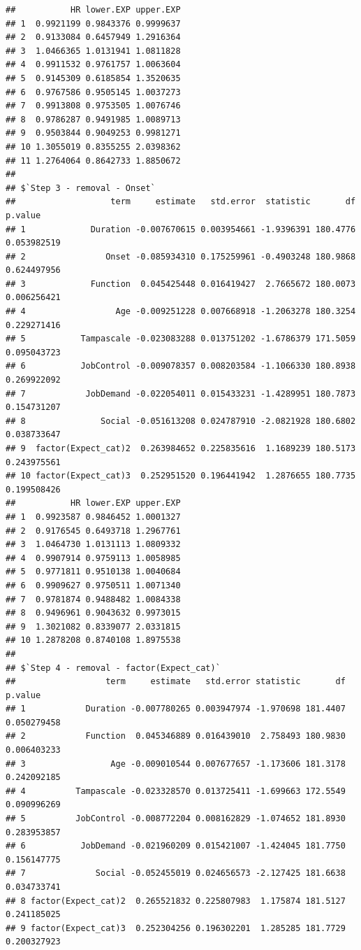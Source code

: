 \documentclass[
]{book}
\begin{document}
\begin{verbatim}
##           HR lower.EXP upper.EXP
## 1  0.9921199 0.9843376 0.9999637
## 2  0.9133084 0.6457949 1.2916364
## 3  1.0466365 1.0131941 1.0811828
## 4  0.9911532 0.9761757 1.0063604
## 5  0.9145309 0.6185854 1.3520635
## 6  0.9767586 0.9505145 1.0037273
## 7  0.9913808 0.9753505 1.0076746
## 8  0.9786287 0.9491985 1.0089713
## 9  0.9503844 0.9049253 0.9981271
## 10 1.3055019 0.8355255 2.0398362
## 11 1.2764064 0.8642733 1.8850672
## 
## $`Step 3 - removal - Onset`
##                   term     estimate   std.error  statistic       df     p.value
## 1             Duration -0.007670615 0.003954661 -1.9396391 180.4776 0.053982519
## 2                Onset -0.085934310 0.175259961 -0.4903248 180.9868 0.624497956
## 3             Function  0.045425448 0.016419427  2.7665672 180.0073 0.006256421
## 4                  Age -0.009251228 0.007668918 -1.2063278 180.3254 0.229271416
## 5           Tampascale -0.023083288 0.013751202 -1.6786379 171.5059 0.095043723
## 6           JobControl -0.009078357 0.008203584 -1.1066330 180.8938 0.269922092
## 7            JobDemand -0.022054011 0.015433231 -1.4289951 180.7873 0.154731207
## 8               Social -0.051613208 0.024787910 -2.0821928 180.6802 0.038733647
## 9  factor(Expect_cat)2  0.263984652 0.225835616  1.1689239 180.5173 0.243975561
## 10 factor(Expect_cat)3  0.252951520 0.196441942  1.2876655 180.7735 0.199508426
##           HR lower.EXP upper.EXP
## 1  0.9923587 0.9846452 1.0001327
## 2  0.9176545 0.6493718 1.2967761
## 3  1.0464730 1.0131113 1.0809332
## 4  0.9907914 0.9759113 1.0058985
## 5  0.9771811 0.9510138 1.0040684
## 6  0.9909627 0.9750511 1.0071340
## 7  0.9781874 0.9488482 1.0084338
## 8  0.9496961 0.9043632 0.9973015
## 9  1.3021082 0.8339077 2.0331815
## 10 1.2878208 0.8740108 1.8975538
## 
## $`Step 4 - removal - factor(Expect_cat)`
##                  term     estimate   std.error statistic       df     p.value
## 1            Duration -0.007780265 0.003947974 -1.970698 181.4407 0.050279458
## 2            Function  0.045346889 0.016439010  2.758493 180.9830 0.006403233
## 3                 Age -0.009010544 0.007677657 -1.173606 181.3178 0.242092185
## 4          Tampascale -0.023328570 0.013725411 -1.699663 172.5549 0.090996269
## 5          JobControl -0.008772204 0.008162829 -1.074652 181.8930 0.283953857
## 6           JobDemand -0.021960209 0.015421007 -1.424045 181.7750 0.156147775
## 7              Social -0.052455019 0.024656573 -2.127425 181.6638 0.034733741
## 8 factor(Expect_cat)2  0.265521832 0.225807983  1.175874 181.5127 0.241185025
## 9 factor(Expect_cat)3  0.252304256 0.196302201  1.285285 181.7729 0.200327923

\end{verbatim}
\end{document}

